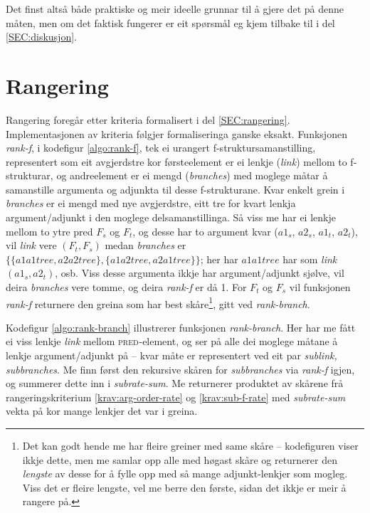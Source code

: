 \documentclass[11pt,a4paper,oneside,draft]{report}
\newcommand{\F}[2]{\textsc{#1}\ensuremath{_{#2}}}
\newcommand{\PRED}{\F{pred}{}}
\begin{document}
Det finst altså både praktiske og meir ideelle grunnar til å gjere det
på denne måten, men om det faktisk fungerer er eit spørsmål eg kjem
tilbake til i del \ref{SEC:diskusjon}.

\section{Rangering}
\label{sec-4.2}

\label{SEC:impl-f-rangering}

 Rangering foregår etter kriteria formalisert i del
 \ref{SEC:rangering}. Implementasjonen av kriteria følgjer
 formaliseringa ganske eksakt. Funksjonen \emph{rank-f}, i kodefigur
 \ref{algo:rank-f}, tek ei urangert f-struktursamanstilling,
 representert som eit avgjerdstre kor førsteelement er ei lenkje
 (\emph{link}) mellom to f-strukturar, og andreelement er ei mengd
 (\emph{branches}) med moglege måtar å samanstille argumenta og adjunkta
 til desse f-strukturane. Kvar enkelt grein i \emph{branches} er ei mengd
 med nye avgjerdstre, eitt tre for kvart lenkja argument/adjunkt i den
 moglege delsamanstillinga. Så viss me har ei lenkje mellom to ytre
 pred $F_s$ og $F_t$, og desse har to argument kvar ($a1_s$, $a2_s$,
 $a1_t$, $a2_t$), vil \emph{link} vere $(F_t,F_s)$ medan \emph{branches} er $\{
 \{ a1a1tree, a2a2tree \}, \{ a1a2tree, a2a1tree \} \}$; her har
 $a1a1tree$ har som \emph{link} $(a1_s, a2_t)$, osb. Viss desse argumenta
 ikkje har argument/adjunkt sjølve, vil deira \emph{branches} vere tomme,
 og deira \emph{rank-f} er då 1. For $F_t$ og $F_s$ vil funksjonen \emph{rank-f}
 returnere den greina som har best skåre\footnote{Det kan godt hende me har fleire greiner med same skåre --
        kodefiguren viser ikkje dette, men me samlar opp alle med
        høgast skåre og returnerer den \emph{lengste} av desse for å fylle
        opp med så mange adjunkt-lenkjer som mogleg. Viss det er
        fleire lengste, vel me berre den første, sidan det ikkje er
        meir å rangere på. }, gitt ved
 \emph{rank-branch}.

 Kodefigur \ref{algo:rank-branch} illustrerer funksjonen
 \emph{rank-branch}. Her har me fått ei viss lenkje \emph{link} mellom
 \PRED{}-element, og ser på alle dei moglege måtane å lenkje
 argument/adjunkt på -- kvar måte er representert ved eit par
 \emph{sublink, subbranches}. Me finn først den rekursive skåren for
 \emph{subbranches} via \emph{rank-f} igjen, og summerer dette inn i
 \emph{subrate-sum}. Me returnerer produktet av skårene frå
 rangeringskriterium \ref{krav:arg-order-rate} og
 \ref{krav:sub-f-rate} med \emph{subrate-sum} vekta på kor mange lenkjer
 det var i greina.
\end{document}

